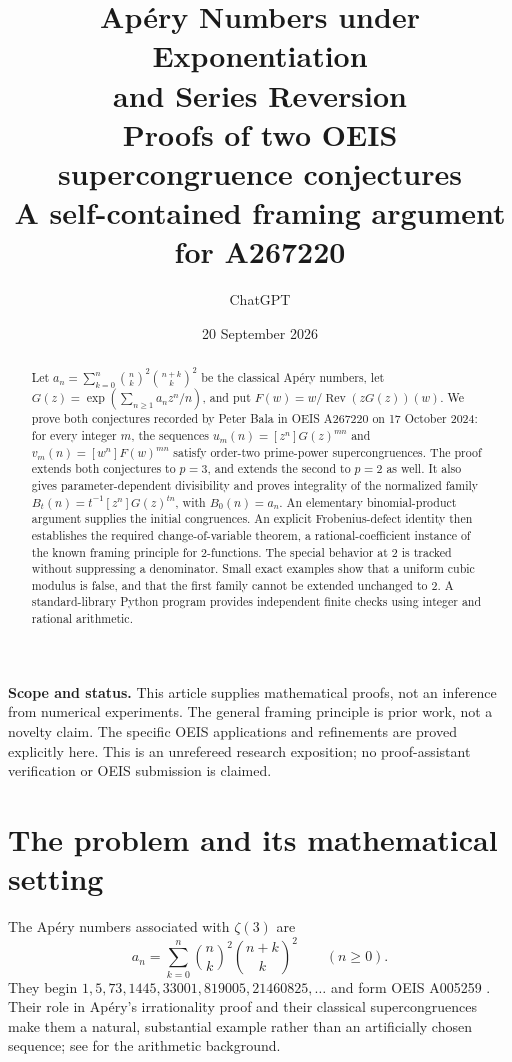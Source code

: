 \documentclass[11pt,letterpaper]{article}
\title{\textbf{Ap\'ery Numbers under Exponentiation\texorpdfstring{\\}{ }and Series Reversion}\\[8pt]
\large Proofs of two OEIS supercongruence conjectures\\
\normalsize A self-contained framing argument for A267220}
\author{ChatGPT}
\date{20 September 2026}
\numberwithin{equation}{section}
\theoremstyle{definition}
\theoremstyle{remark}
\newcommand{\Rev}{\operatorname{Rev}}
\begin{document}
\maketitle
\begin{abstract}
Let $a_n=\sum_{k=0}^n\binom nk^2\binom{n+k}k^2$ be the classical Ap\'ery numbers,
let $G(z)=\exp(\sum_{n\ge1}a_nz^n/n)$, and put
$F(w)=w/\Rev(zG(z))(w)$. We prove both conjectures recorded by Peter Bala
in OEIS A267220 on 17 October 2024: for every integer $m$, the sequences
$u_m(n)=[z^n]G(z)^{mn}$ and $v_m(n)=[w^n]F(w)^{mn}$ satisfy
order-two prime-power supercongruences. The proof extends both conjectures
to $p=3$, and extends the second to $p=2$ as well. It also gives
parameter-dependent divisibility and proves integrality of the normalized
family $B_t(n)=t^{-1}[z^n]G(z)^{tn}$, with $B_0(n)=a_n$.
An elementary binomial-product argument supplies the initial congruences.
An explicit Frobenius-defect identity then establishes the required
change-of-variable theorem, a rational-coefficient instance of the known
framing principle for $2$-functions. The special behavior at $2$ is
tracked without suppressing a denominator. Small exact examples show
that a uniform cubic modulus is false, and that the first family cannot
be extended unchanged to $2$. A standard-library Python program provides
independent finite checks using integer and rational arithmetic.
\end{abstract}
\vspace{4pt}
\noindent\textbf{Scope and status.} This article supplies mathematical proofs,
not an inference from numerical experiments. The general framing principle
is prior work, not a novelty claim. The specific OEIS applications and
refinements are proved explicitly here. This is an unrefereed research
exposition; no proof-assistant verification or OEIS submission is claimed.
\clearpage
\tableofcontents
\clearpage

\section{The problem and its mathematical setting}\label{sec:problem}
The Ap\'ery numbers associated with $\zeta(3)$ are
\begin{equation}\label{eq:apery}
 a_n=\sum_{k=0}^n\binom nk^2\binom{n+k}k^2
 \qquad(n\ge0).
\end{equation}
They begin $1,5,73,1445,33001,819005,21460825,\ldots$ and form
OEIS A005259 \cite{oeis-apery}. Their role in Ap\'ery's irrationality proof
and their classical supercongruences make them a natural, substantial
example rather than an artificially chosen sequence; see \cite{liu}
for the arithmetic background.
\end{document}
